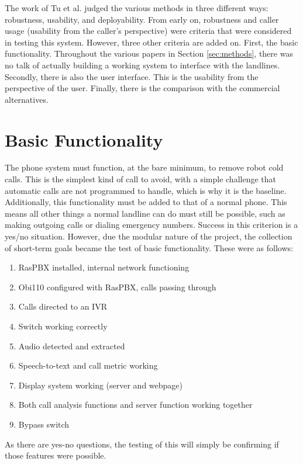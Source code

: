 \documentclass[main.tex]{subfiles}
\begin{document}
The work of Tu et al. \cite{cisco} judged the various methods in three different ways: robustness, usability, and deployability. From early on, robustness and caller usage (usability from the caller's perspective) were criteria that were considered in testing this system. However, three other criteria are added on. First, the basic functionality. Throughout the various papers in Section \ref{sec:methods}, there was no talk of actually building a working system to interface with the landlines. Secondly, there is also the user interface. This is the usability from the perspective of the user. Finally, there is the comparison with the commercial alternatives.

\section{Basic Functionality}\label{sec:test-basic}
The phone system must function, at the bare minimum, to remove robot cold calls. This is the simplest kind of call to avoid, with a simple challenge that automatic calls are not programmed to handle, which is why it is the baseline. Additionally, this functionality must be added to that of a normal phone. This means all other things a normal landline can do must still be possible, such as making outgoing calls or dialing emergency numbers. Success in this criterion is a yes/no situation. However, due the modular nature of the project, the collection of short-term goals became the test of basic functionality. These were as follows:

\begin{enumerate}
	\item RasPBX installed, internal network functioning
	\item Obi110 configured with RasPBX, calls passing through
	\item Calls directed to an IVR
	\item Switch working correctly
	\item Audio detected and extracted
	\item Speech-to-text and call metric working
	\item Display system working (server and webpage)
	\item Both call analysis functions and server function working together
	\item Bypass switch
\end{enumerate}

As there are yes-no questions, the testing of this will simply be confirming if those features were possible.
\end{document}
